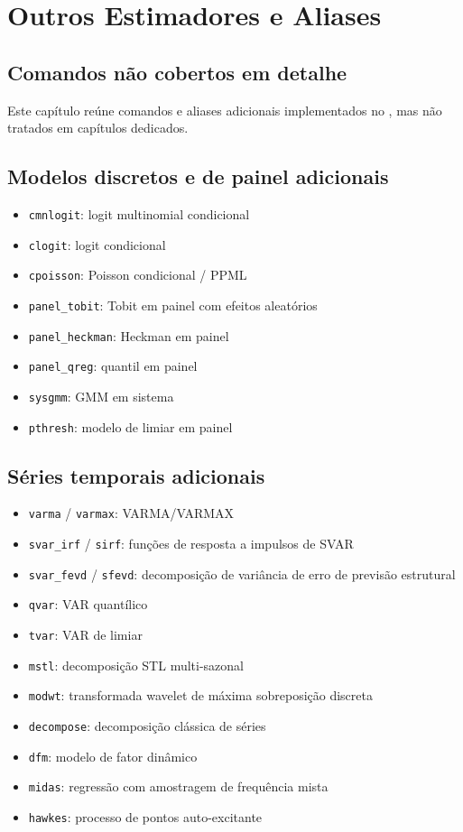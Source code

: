 \chapter{Outros Estimadores e Aliases}

\section{Comandos não cobertos em detalhe}

Este capítulo reúne comandos e aliases adicionais implementados no
\hayashi{}, mas não tratados em capítulos dedicados.

\section{Modelos discretos e de painel adicionais}

\begin{itemize}
\item \texttt{cmnlogit}: logit multinomial condicional
\item \texttt{clogit}: logit condicional
\item \texttt{cpoisson}: Poisson condicional / PPML
\item \texttt{panel\_tobit}: Tobit em painel com efeitos aleatórios
\item \texttt{panel\_heckman}: Heckman em painel
\item \texttt{panel\_qreg}: quantil em painel
\item \texttt{sysgmm}: GMM em sistema
\item \texttt{pthresh}: modelo de limiar em painel
\end{itemize}

\section{Séries temporais adicionais}

\begin{itemize}
\item \texttt{varma} / \texttt{varmax}: VARMA/VARMAX
\item \texttt{svar\_irf} / \texttt{sirf}: funções de resposta a impulsos de SVAR
\item \texttt{svar\_fevd} / \texttt{sfevd}: decomposição de variância de erro de
      previsão estrutural
\item \texttt{qvar}: VAR quantílico
\item \texttt{tvar}: VAR de limiar
\item \texttt{mstl}: decomposição STL multi-sazonal
\item \texttt{modwt}: transformada wavelet de máxima sobreposição discreta
\item \texttt{decompose}: decomposição clássica de séries
\item \texttt{dfm}: modelo de fator dinâmico
\item \texttt{midas}: regressão com amostragem de frequência mista
\item \texttt{hawkes}: processo de pontos auto-excitante
\end{itemize}

